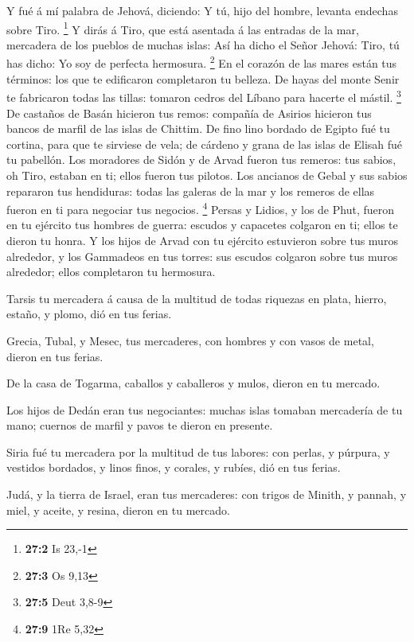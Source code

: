  Y fué á mí palabra de Jehová, diciendo:  Y
tú, hijo del hombre, levanta endechas sobre Tiro. \footnote{\textbf{27:2}
  Is 23,-1}  Y dirás á Tiro, que está asentada á las
entradas de la mar, mercadera de los pueblos de muchas islas: Así ha
dicho el Señor Jehová: Tiro, tú has dicho: Yo soy de perfecta hermosura.
\footnote{\textbf{27:3} Os 9,13}  En el corazón de las
mares están tus términos: los que te edificaron completaron tu belleza.
 De hayas del monte Senir te fabricaron todas las tillas:
tomaron cedros del Líbano para hacerte el mástil. \footnote{\textbf{27:5}
  Deut 3,8-9}  De castaños de Basán hicieron tus remos:
compañía de Asirios hicieron tus bancos de marfil de las islas de
Chittim.  De fino lino bordado de Egipto fué tu cortina,
para que te sirviese de vela; de cárdeno y grana de las islas de Elisah
fué tu pabellón.  Los moradores de Sidón y de Arvad fueron
tus remeros: tus sabios, oh Tiro, estaban en ti; ellos fueron tus
pilotos.  Los ancianos de Gebal y sus sabios repararon tus
hendiduras: todas las galeras de la mar y los remeros de ellas fueron en
ti para negociar tus negocios. \footnote{\textbf{27:9} 1Re 5,32}
 Persas y Lidios, y los de Phut, fueron en tu ejército
tus hombres de guerra: escudos y capacetes colgaron en ti; ellos te
dieron tu honra.  Y los hijos de Arvad con tu ejército
estuvieron sobre tus muros alrededor, y los Gammadeos en tus torres: sus
escudos colgaron sobre tus muros alrededor; ellos completaron tu
hermosura.

 Tarsis tu mercadera á causa de la multitud de todas
riquezas en plata, hierro, estaño, y plomo, dió en tus ferias.

 Grecia, Tubal, y Mesec, tus mercaderes, con hombres y
con vasos de metal, dieron en tus ferias.

 De la casa de Togarma, caballos y caballeros y mulos,
dieron en tu mercado.

 Los hijos de Dedán eran tus negociantes: muchas islas
tomaban mercadería de tu mano; cuernos de marfil y pavos te dieron en
presente.

 Siria fué tu mercadera por la multitud de tus labores:
con perlas, y púrpura, y vestidos bordados, y linos finos, y corales, y
rubíes, dió en tus ferias.

 Judá, y la tierra de Israel, eran tus mercaderes: con
trigos de Minith, y pannah, y miel, y aceite, y resina, dieron en tu
mercado.

